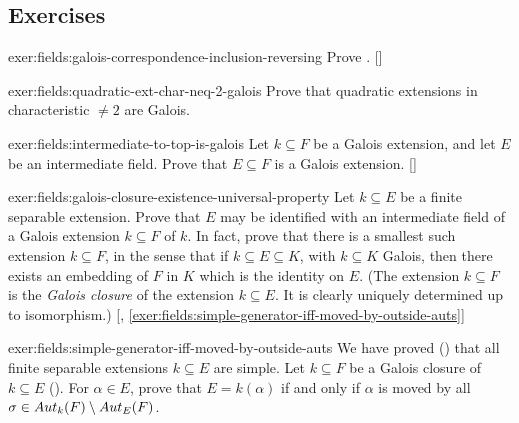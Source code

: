 \subsection*{Exercises}

\begin{exer}{}{exer:fields:galois-correspondence-inclusion-reversing}
  Prove
  . []
\end{exer}
\begin{exer}{}{exer:fields:quadratic-ext-char-neq-2-galois}
  Prove that quadratic extensions in characteristic $\neq 2$ are
  Galois.
\end{exer}
\begin{exer}{}{exer:fields:intermediate-to-top-is-galois}
  Let $k \subseteq F$ be a Galois extension, and let $E$ be an
  intermediate field. Prove that $E \subseteq F$ is a Galois
  extension.
  []
\end{exer}
\begin{exer}{}{exer:fields:galois-closure-existence-universal-property}
  Let $k \subseteq E$ be a finite separable extension. Prove that $E$
  may be identified with an intermediate field of a Galois extension
  $k \subseteq F$ of $k$. In fact, prove that there is a smallest such
  extension $k \subseteq F$, in the sense that if
  $k \subseteq E \subseteq K$, with $k \subseteq K$ Galois, then there
  exists an embedding of $F$ in $K$ which is the identity on $E$. (The
  extension $k \subseteq F$ is the \emph{Galois closure} of the
  extension $k \subseteq E$. It is clearly uniquely determined up to
  isomorphism.)
  [,
  \ref{exer:fields:simple-generator-iff-moved-by-outside-auts}]
\end{exer}
\begin{exer}{}{exer:fields:simple-generator-iff-moved-by-outside-auts}
  We have proved () that all finite separable
  extensions $k \subseteq E$ are simple. Let $k \subseteq F$ be a
  Galois closure of $k \subseteq E$
  (). For
  $\alpha \in E$, prove that $E = k(\alpha)$ if and only if $\alpha$
  is moved by all $\sigma \in Aut_k(F) \mathbin{\backslash} Aut_E(F)$.
\end{exer}
